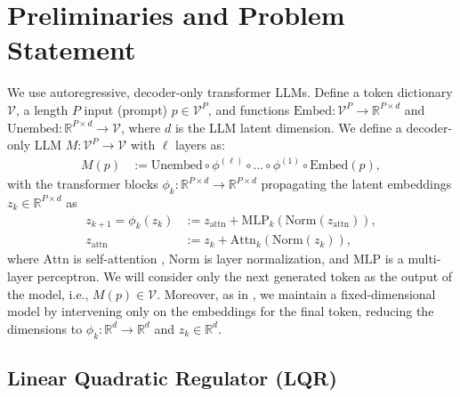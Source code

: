 \documentclass{article}
\newcommand{\bR}{\mathbb{R}}
\newcommand{\mc}{\mathcal}
\theoremstyle{plain}
\theoremstyle{definition}
\theoremstyle{remark}
\begin{document}
\section{Preliminaries and Problem Statement}

We use autoregressive, decoder-only transformer LLMs. Define a token dictionary $\mc V$, a length $P$ input (prompt) $p \in \mc V^P$, and functions $\text{Embed}: \mc V^{P} \to \bR^{P\times d}$ and $\text{Unembed}: \bR^{P\times d}\to \mc V$, where $d$ is the LLM latent dimension. We define a decoder-only LLM $M: \mc V^{P} \to \mc V$ with $\ell$ layers as:
\begin{equation}\label{llm}
    \begin{aligned}
        M(p) &:= \text{Unembed} \circ \phi^{(\ell)} \circ ... \circ \phi^{(1)} \circ \text{Embed}(p),
    \end{aligned}
\end{equation}
with the transformer blocks $\phi_k: \bR^{P\times d} \to \bR^{P\times d}$ propagating the latent embeddings $z_k \in \bR^{P\times d}$ as
\begin{equation}\label{transformer}
\begin{aligned}
    z_{k+1} = \phi_k(z_k) &:= z_{\text{attn}} + \text{MLP}_k(\text{Norm}(z_{\text{attn}})), \\
    z_{\text{attn}} &:= z_k + \text{Attn}_k(\text{Norm}(z_k)),
\end{aligned}
\end{equation}
where $\text{Attn}$ is self-attention \cite{Vaswani_2017}, $\text{Norm}$ is layer normalization, and $\text{MLP}$ is a multi-layer perceptron. We will consider only the next generated token as the output of the model, i.e., $M(p) \in \mc V$. Moreover, as in \citet{Karnik_Bansal_2025}, we maintain a fixed-dimensional model by intervening only on the embeddings for the final token, reducing the dimensions to $\phi_k: \mathbb{R}^d\rightarrow \mathbb{R}^d$ and $z_k \in \mathbb{R}^d$.

\subsection{Linear Quadratic Regulator (LQR)}
\end{document}
